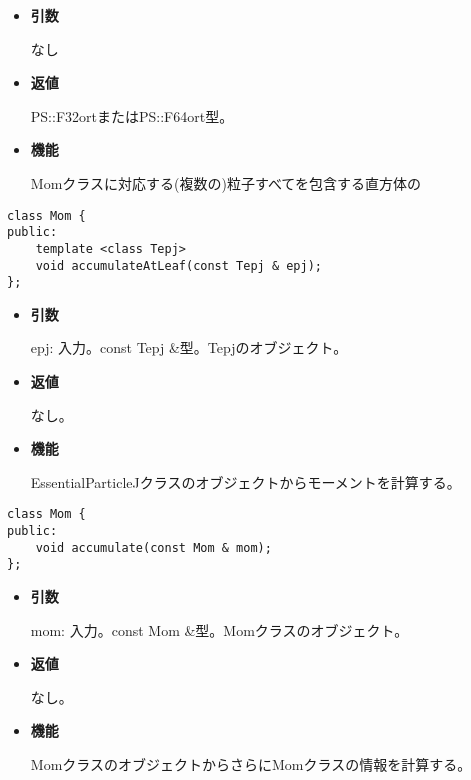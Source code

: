 \begin{itemize}

\item {\bf 引数}

  なし
  
\item {\bf 返値}

  PS::F32ortまたはPS::F64ort型。

\item {\bf 機能}

  Momクラスに対応する(複数の)粒子すべてを包含する直方体の
  
\end{itemize}



\begin{screen}
\begin{verbatim}
class Mom {
public:
    template <class Tepj>
    void accumulateAtLeaf(const Tepj & epj);
};
\end{verbatim}
\end{screen}

\begin{itemize}

\item {\bf 引数}

  epj: 入力。const Tepj \&型。Tepjのオブジェクト。
  
\item {\bf 返値}

  なし。

\item {\bf 機能}

  EssentialParticleJクラスのオブジェクトからモーメントを計算する。
  
\end{itemize}


\begin{screen}
\begin{verbatim}
class Mom {
public:
    void accumulate(const Mom & mom);
};
\end{verbatim}
\end{screen}

\begin{itemize}

\item {\bf 引数}

  mom: 入力。const Mom \&型。Momクラスのオブジェクト。
  
\item {\bf 返値}

  なし。

\item {\bf 機能}

  MomクラスのオブジェクトからさらにMomクラスの情報を計算する。
  
\end{itemize}

